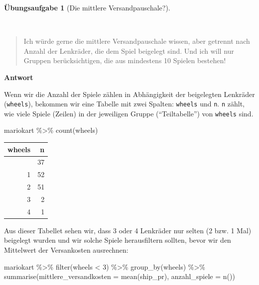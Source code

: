 \documentclass[
  a4paper,
]{scrbook}
\newenvironment{Shaded}{\begin{snugshade}}{\end{snugshade}}
\newcommand{\AttributeTok}[1]{\textcolor[rgb]{0.40,0.45,0.13}{#1}}
\newcommand{\DecValTok}[1]{\textcolor[rgb]{0.68,0.00,0.00}{#1}}
\newcommand{\FunctionTok}[1]{\textcolor[rgb]{0.28,0.35,0.67}{#1}}
\newcommand{\NormalTok}[1]{\textcolor[rgb]{0.00,0.23,0.31}{#1}}
\newcommand{\SpecialCharTok}[1]{\textcolor[rgb]{0.37,0.37,0.37}{#1}}
\theoremstyle{definition}
\theoremstyle{definition}
\theoremstyle{definition}
\newtheorem{exercise}{Übungsaufgabe}[chapter]
\theoremstyle{remark}
\begin{document}
\begin{exercise}[Die mittlere
Versandpauschale?]\protect\hypertarget{exr-Forschungsfrage2}{}\label{exr-Forschungsfrage2}

~

\begin{quote}
{} Ich würde gerne die mittlere Versandpauschale wissen,
aber getrennt nach Anzahl der Lenkräder, die dem Spiel beigelegt sind.
Und ich will nur Gruppen berücksichtigen, die aus mindestens 10 Spielen
bestehen!
\end{quote}

\textbf{Antwort}

Wenn wir die Anzahl der Spiele zählen in Abhängigkeit der beigelegten
Lenkräder (\texttt{wheels}), bekommen wir eine Tabelle mit zwei Spalten:
\texttt{wheels} und \texttt{n}. \texttt{n} zählt, wie viele Spiele
(Zeilen) in der jeweiligen Gruppe (``Teiltabelle'') von \texttt{wheels}
sind.

\begin{Shaded}
\begin{Highlighting}[]
\NormalTok{mariokart }\SpecialCharTok{\%\textgreater{}\%}
  \FunctionTok{count}\NormalTok{(wheels)}
\end{Highlighting}
\end{Shaded}

\begin{longtable}[]{@{}rr@{}}
\toprule\noalign{}
wheels & n \\
\midrule\noalign{}
\endhead
\bottomrule\noalign{}
\endlastfoot
0 & 37 \\
1 & 52 \\
2 & 51 \\
3 & 2 \\
4 & 1 \\
\end{longtable}

Aus dieser Tabellet sehen wir, dass 3 oder 4 Lenkräder nur selten (2
bzw. 1 Mal) beigelegt wurden und wir solche Spiele herausfiltern
sollten, bevor wir den Mittelwert der Versankosten ausrechnen:

\begin{Shaded}
\begin{Highlighting}[]
\NormalTok{mariokart }\SpecialCharTok{\%\textgreater{}\%}
  \FunctionTok{filter}\NormalTok{(wheels }\SpecialCharTok{\textless{}} \DecValTok{3}\NormalTok{) }\SpecialCharTok{\%\textgreater{}\%} 
  \FunctionTok{group\_by}\NormalTok{(wheels) }\SpecialCharTok{\%\textgreater{}\%} 
  \FunctionTok{summarise}\NormalTok{(}\AttributeTok{mittlere\_versandkosten =} \FunctionTok{mean}\NormalTok{(ship\_pr),}
            \AttributeTok{anzahl\_spiele =} \FunctionTok{n}\NormalTok{())}
\end{Highlighting}
\end{Shaded}


\end{exercise}
\end{document}
